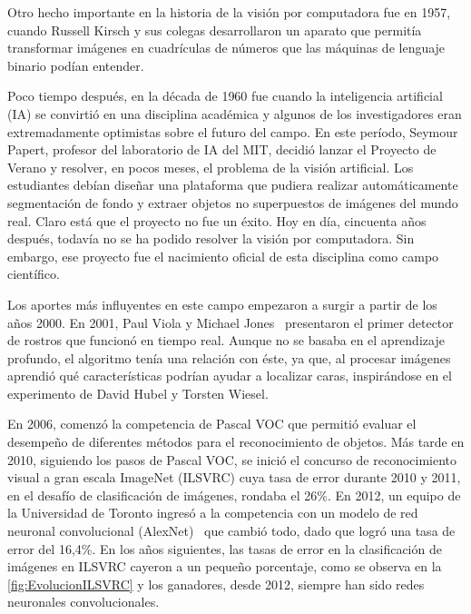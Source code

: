 Otro hecho importante en la historia de la visión por computadora fue en 1957, cuando Russell Kirsch y sus colegas desarrollaron un aparato que permitía transformar imágenes en cuadrículas de números que las máquinas de lenguaje binario podían entender. 

Poco tiempo después, en la década de 1960 fue cuando la inteligencia artificial (IA) se convirtió en una disciplina académica y algunos de los investigadores eran extremadamente optimistas sobre el futuro del campo. En este período, Seymour Papert, profesor del laboratorio de IA del MIT, decidió lanzar el Proyecto de Verano y resolver, en pocos meses, el problema de la visión artificial. Los estudiantes debían diseñar una plataforma que pudiera realizar automáticamente segmentación de fondo y extraer objetos no superpuestos de imágenes del mundo real. Claro está que el proyecto no fue un éxito.  Hoy en día, cincuenta años después, todavía no se ha podido resolver la visión por computadora. Sin embargo, ese proyecto fue el nacimiento oficial de esta disciplina como campo científico. 

Los aportes más influyentes en este campo empezaron a surgir a partir de los años 2000. En 2001, Paul Viola y Michael Jones~\cite{viola2001rapid} presentaron el primer detector de rostros que funcionó en tiempo real. Aunque no se basaba en el aprendizaje profundo, el algoritmo tenía una relación con éste, ya que, al procesar imágenes aprendió qué características podrían ayudar a localizar caras, inspirándose en el experimento de David Hubel y Torsten Wiesel. 

En 2006, comenzó la competencia de Pascal VOC que permitió evaluar el desempeño de diferentes métodos para el reconocimiento de objetos. Más tarde en 2010, siguiendo los pasos de Pascal VOC, se inició el concurso de reconocimiento visual a gran escala ImageNet (ILSVRC) cuya tasa de error durante 2010 y 2011, en el desafío de clasificación de imágenes, rondaba el 26\%.  En 2012, un equipo de la Universidad de Toronto ingresó a la competencia con un modelo de red neuronal convolucional (AlexNet)~\cite{krizhevsky2012imagenet} que cambió todo, dado que logró una tasa de error del 16,4\%. En los años siguientes, las tasas de error en la clasificación de imágenes en ILSVRC cayeron a un pequeño porcentaje, como se observa en la \autoref{fig:EvolucionILSVRC} y los ganadores, desde 2012, siempre han sido redes neuronales convolucionales.

